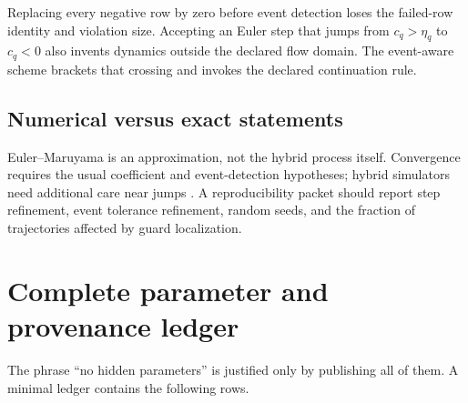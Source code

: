 \documentclass[11pt]{article}
\theoremstyle{definition}
\theoremstyle{remark}
\begin{document}
Replacing every negative row by zero before event detection loses the
failed-row identity and violation size.  Accepting an Euler step that jumps
from $c_q>\eta_q$ to $c_q<0$ also invents dynamics outside the declared
flow domain.  The event-aware scheme brackets that crossing and invokes the
declared continuation rule.

\subsection{Numerical versus exact statements}

Euler--Maruyama is an approximation, not the hybrid process itself.
Convergence requires the usual coefficient and event-detection hypotheses;
hybrid simulators need additional care near jumps
\cite{SanfeliceTeel2010,Higham2001}.  A reproducibility packet should report
step refinement, event tolerance refinement, random seeds, and the fraction
of trajectories affected by guard localization.

\section{Complete parameter and provenance ledger}
\label{sec:ledger}

The phrase ``no hidden parameters'' is justified only by publishing all of
them.  A minimal ledger contains the following rows.
\end{document}
